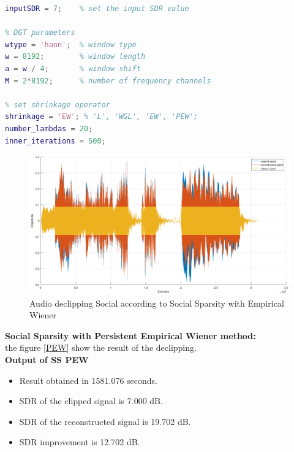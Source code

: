 \documentclass{article}
\numberwithin{dummy}{section}
\begin{document}
\begin{lstlisting}[language=Matlab]
% input SDR of the clipped signal
inputSDR = 7;    % set the input SDR value

% DGT parameters
wtype = 'hann';  % window type
w = 8192;        % window length
a = w / 4;       % window shift
M = 2*8192;      % number of frequency channels

% set shrinkage operator
shrinkage = 'EW'; % 'L', 'WGL', 'EW', 'PEW';
number_lambdas = 20;
inner_iterations = 500;
\end{lstlisting}
\begin{figure}[ht!]
    \centering
    \includegraphics[scale=0.3]{figures/courbe.png}
    \caption{Audio declipping Social according to Social Sparsity with Empirical Wiener}
    \label{c}
\end{figure}
\textbf{Social Sparsity with Persistent Empirical Wiener method:}\\
 the figure \ref{PEW} show the result of the declipping.\\
\textbf{Output of SS PEW}
\begin{itemize}
    \item Result obtained in 1581.076 seconds.
    \item SDR of the clipped signal is 7.000 dB.
    \item SDR of the reconstructed signal is 19.702 dB.
    \item SDR improvement is 12.702 dB.
\end{itemize}
\end{document}
